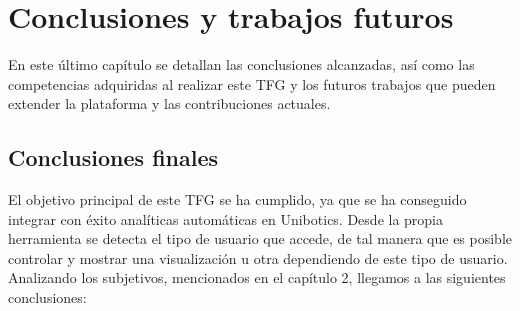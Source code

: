 \chapter{Conclusiones y trabajos futuros}\label{conclusión}

	En este último capítulo se detallan las conclusiones alcanzadas, así como las competencias adquiridas al realizar este TFG y los futuros trabajos que pueden extender la plataforma y las contribuciones actuales.
	
	\section{Conclusiones finales} 
	\label{sec:conclusiones_finales} 
El objetivo principal de este TFG se ha cumplido, ya que se ha conseguido integrar con éxito analíticas automáticas en Unibotics. Desde la propia herramienta se detecta el tipo de usuario que accede, de tal manera que es posible controlar y mostrar una visualización u otra dependiendo de este tipo de usuario. Analizando los subjetivos, mencionados en el capítulo 2, llegamos a las siguientes conclusiones:\\
